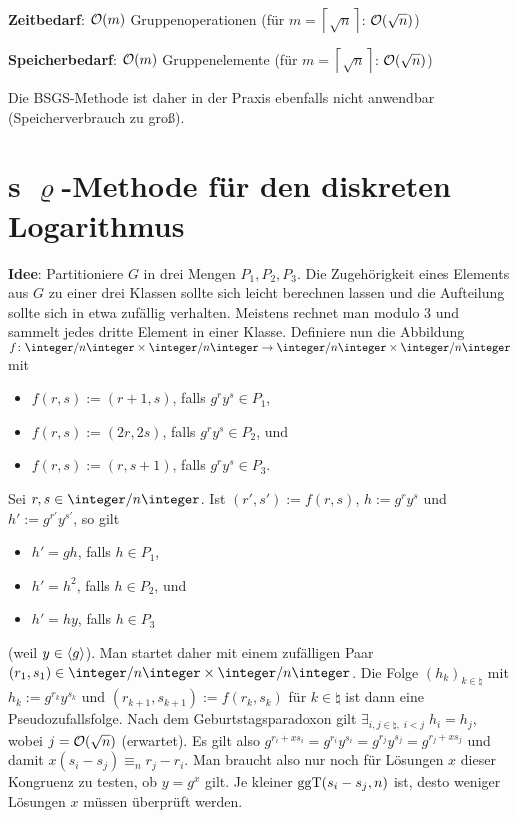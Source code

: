 \linie

\textbf{Zeitbedarf}:
$\mathcal{O}(m)$ Gruppenoperationen (für $m = \left\lceil\sqrt{n}\right\rceil$: $\mathcal{O}(\sqrt{n})$)

\textbf{Speicherbedarf}:
$\mathcal{O}(m)$ Gruppenelemente (für $m = \left\lceil\sqrt{n}\right\rceil$: $\mathcal{O}(\sqrt{n})$)

Die BSGS-Methode ist daher in der Praxis ebenfalls nicht anwendbar (Speicherverbrauch zu groß).

\pagebreak

\section{%
    s \texorpdfstring{$\varrho$}{ρ}-Methode für den diskreten Logarithmus%
}

\textbf{Idee}:
Partitioniere $G$ in drei Mengen $P_1, P_2, P_3$.
Die Zugehörigkeit eines Elements aus $G$ zu einer drei Klassen sollte sich leicht berechnen
lassen und die Aufteilung sollte sich in etwa zufällig verhalten.
Meistens rechnet man modulo $3$ und sammelt jedes dritte Element in einer Klasse.
Definiere nun die Abbildung $f\colon \ZnZ \times \ZnZ \rightarrow \ZnZ \times \ZnZ$ mit
\begin{itemize}
    \item
    $f(r, s) := (r + 1, s)$, falls $g^r y^s \in P_1$,

    \item
    $f(r, s) := (2r, 2s)$, falls $g^r y^s \in P_2$, und

    \item
    $f(r, s) := (r, s + 1)$, falls $g^r y^s \in P_3$.
\end{itemize}
Sei $r, s \in \ZnZ$.
Ist $(r', s') := f(r, s)$, $h := g^r y^s$ und $h' := g^{r'} y^{s'}$, so gilt
\begin{itemize}
    \item
    $h' = gh$, falls $h \in P_1$,

    \item
    $h' = h^2$, falls $h \in P_2$, und

    \item
    $h' = hy$, falls $h \in P_3$
\end{itemize}
(weil $y \in \langle g\rangle$).
Man startet daher mit einem zufälligen Paar $(r_1, s_1) \in \ZnZ \times \ZnZ$.
Die Folge $(h_k)_{k \in \natural}$ mit $h_k := g^{r_k} y^{s_k}$ und
$(r_{k+1}, s_{k+1}) := f(r_k, s_k)$ für $k \in \natural$ ist dann eine Pseudozufallsfolge.
Nach dem Geburtstagsparadoxon gilt $\exists_{i, j \in \natural,\; i < j}\; h_i = h_j$, wobei
$j = \mathcal{O}(\sqrt{n})$ (erwartet).
Es gilt also $g^{r_i+xs_i} = g^{r_i} y^{s_i} = g^{r_j} y^{s_j} = g^{r_j+xs_j}$
und damit $x(s_i - s_j) \equiv_n r_j - r_i$.
Man braucht also nur noch für Lösungen $x$ dieser Kongruenz zu testen, ob $y = g^x$ gilt.
Je kleiner $\operatorname{ggT}(s_i - s_j, n)$ ist, desto weniger Lösungen $x$ müssen überprüft werden.

